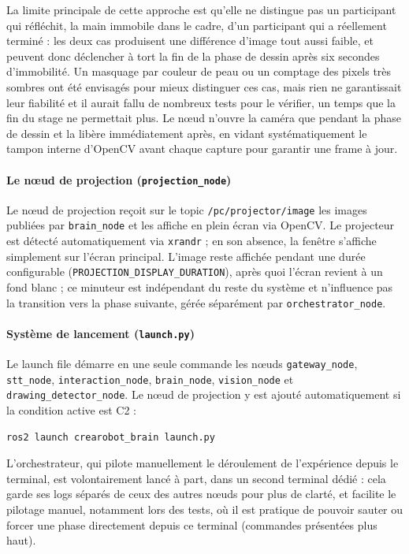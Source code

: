 \documentclass[11pt]{article}
\begin{document}
La limite principale de cette approche est qu'elle ne distingue pas un participant qui réfléchit, la main immobile dans le cadre, d'un participant qui a réellement terminé : les deux cas produisent une différence d'image tout aussi faible, et peuvent donc déclencher à tort la fin de la phase de dessin après six secondes d'immobilité. Un masquage par couleur de peau ou un comptage des pixels très sombres ont été envisagés pour mieux distinguer ces cas, mais rien ne garantissait leur fiabilité et il aurait fallu de nombreux tests pour le vérifier, un temps que la fin du stage ne permettait plus. Le nœud n'ouvre la caméra que pendant la phase de dessin et la libère immédiatement après, en vidant systématiquement le tampon interne d'OpenCV avant chaque capture pour garantir une frame à jour.

\paragraph{Le nœud de projection (\texttt{projection\_node})}

Le nœud de projection reçoit sur le topic \texttt{/pc/projector/image} les images publiées par \texttt{brain\_node} et les affiche en plein écran via OpenCV. Le projecteur est détecté automatiquement via \texttt{xrandr} ; en son absence, la fenêtre s'affiche simplement sur l'écran principal. L'image reste affichée pendant une durée configurable (\texttt{PROJECTION\_DISPLAY\_DURATION}), après quoi l'écran revient à un fond blanc ; ce minuteur est indépendant du reste du système et n'influence pas la transition vers la phase suivante, gérée séparément par \texttt{orchestrator\_node}.

\paragraph{Système de lancement (\texttt{launch.py})}

Le launch file démarre en une seule commande les nœuds \texttt{gateway\_node}, \texttt{stt\_node}, \texttt{interaction\_node}, \texttt{brain\_node}, \texttt{vision\_node} et \texttt{drawing\_detector\_node}. Le nœud de projection y est ajouté automatiquement si la condition active est C2 :

\begin{verbatim}
ros2 launch crearobot_brain launch.py
\end{verbatim}

L'orchestrateur, qui pilote manuellement le déroulement de l'expérience depuis le terminal, est volontairement lancé à part, dans un second terminal dédié : cela garde ses logs séparés de ceux des autres nœuds pour plus de clarté, et facilite le pilotage manuel, notamment lors des tests, où il est pratique de pouvoir sauter ou forcer une phase directement depuis ce terminal (commandes présentées plus haut).
\end{document}
